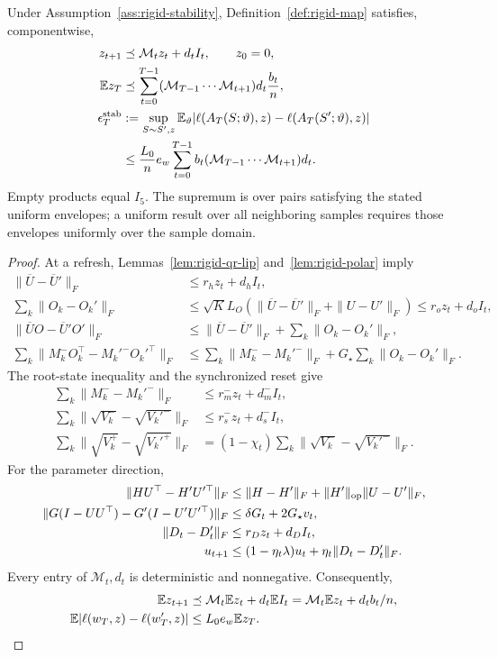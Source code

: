 \begin{theorem}\label{thm:tf-stability}
Under Assumption~\ref{ass:rigid-stability}, Definition~\ref{def:rigid-map} satisfies,
componentwise,
\begin{align}
 z_{t+1}&\preceq\mathcal M_tz_t+d_tI_t,\qquad z_0=0,\\
 \mathbb E z_T&\preceq\sum_{t=0}^{T-1}
       (\mathcal M_{T-1}\cdots\mathcal M_{t+1})d_t\frac{b_t}{n},\\
 \epsilon_T^{\mathrm{stab}}
 &:=\sup_{S\sim S',z}\mathbb E_\vartheta
       |\ell(A_T(S;\vartheta),z)-\ell(A_T(S';\vartheta),z)|\\
 &\le\frac{L_0}{n}e_w\sum_{t=0}^{T-1}b_t
             (\mathcal M_{T-1}\cdots\mathcal M_{t+1})d_t.
 \label{eq:rigid-stability-product}
\end{align}
Empty products equal $I_5$. The supremum is over pairs satisfying the stated
uniform envelopes; a uniform result over all neighboring samples requires those
envelopes uniformly over the sample domain.
\end{theorem}
\begin{proof}
At a refresh, Lemmas~\ref{lem:rigid-qr-lip} and~\ref{lem:rigid-polar} imply
\begin{align}
 \|\overline U-\overline U'\|_F&\le r_hz_t+d_hI_t,\\
 \sum_k\|O_k-O_k'\|_F
 &\le\sqrt K L_O(\|\overline U-\overline U'\|_F+\|U-U'\|_F)
 \le r_oz_t+d_oI_t,\\
 \|\overline UO-\overline U'O'\|_F
 &\le\|\overline U-\overline U'\|_F+\sum_k\|O_k-O_k'\|_F,\\
 \sum_k\|M_k^-O_k^\top-M_k'^{-}O_k'^\top\|_F
 &\le\sum_k\|M_k^--M_k'^{-}\|_F+G_\star\sum_k\|O_k-O_k'\|_F.
\end{align}
The root-state inequality and the synchronized reset give
\begin{align}
 \sum_k\|M_k^--M_k'^{-}\|_F&\le r_m^-z_t+d_m^-I_t,\\
 \sum_k\|\sqrt{V_k^-}-\sqrt{V_k'^{-}}\|_F&\le r_s^-z_t+d_s^-I_t,\\
 \sum_k\|\sqrt{V_k^+}-\sqrt{V_k'^{+}}\|_F
 &=(1-\chi_t)\sum_k\|\sqrt{V_k^-}-\sqrt{V_k'^{-}}\|_F.
\end{align}
For the parameter direction,
\begin{align}
 \|HU^\top-H'U'^\top\|_F
 &\le\|H-H'\|_F+\|H'\|_{\mathrm{op}}\|U-U'\|_F,\\
 \|G(I-UU^\top)-G'(I-U'U'^\top)\|_F
 &\le\delta G_t+2G_\star v_t,\\
 \|D_t-D_t'\|_F&\le r_Dz_t+d_DI_t,\\
 u_{t+1}&\le(1-\eta_t\lambda)u_t+\eta_t\|D_t-D_t'\|_F.
\end{align}
Every entry of $\mathcal M_t,d_t$ is deterministic and nonnegative. Consequently,
\begin{align}
 \mathbb E z_{t+1}&\preceq\mathcal M_t\mathbb E z_t+d_t\mathbb E I_t
 =\mathcal M_t\mathbb E z_t+d_tb_t/n,\\
 \mathbb E|\ell(w_T,z)-\ell(w_T',z)|&\le L_0 e_w\mathbb E z_T.
\end{align}
\end{proof}
